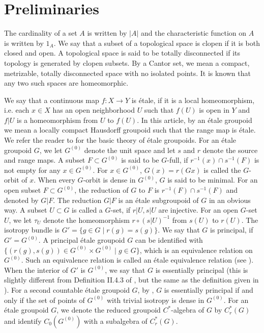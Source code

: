 \documentclass[11pt]{article}
\theoremstyle{definition}
\begin{document}
\section{Preliminaries}

The cardinality of a set $A$ is written by $\lvert A\rvert$ and 
the characteristic function on $A$ is written by $1_A$. 
We say that a subset of a topological space is clopen 
if it is both closed and open. 
A topological space is said to be totally disconnected 
if its topology is generated by clopen subsets. 
By a Cantor set, 
we mean a compact, metrizable, totally disconnected space 
with no isolated points. 
It is known that any two such spaces are homeomorphic. 

We say that a continuous map $f:X\to Y$ is \'etale, 
if it is a local homeomorphism, 
i.e. each $x\in X$ has an open neighborhood $U$ such that 
$f(U)$ is open in $Y$ and $f|U$ is a homeomorphism from $U$ to $f(U)$. 
In this article, by an \'etale groupoid 
we mean a locally compact Hausdorff groupoid 
such that the range map is \'etale. 
We refer the reader to \cite{R1,R3} 
for the basic theory of \'etale groupoids. 
For an \'etale groupoid $G$, 
we let $G^{(0)}$ denote the unit space and 
let $s$ and $r$ denote the source and range maps. 
A subset $F\subset G^{(0)}$ is said to be $G$-full, 
if $r^{-1}(x)\cap s^{-1}(F)$ is not empty for any $x\in G^{(0)}$. 
For $x\in G^{(0)}$, 
$G(x)=r(Gx)$ is called the $G$-orbit of $x$. 
When every $G$-orbit is dense in $G^{(0)}$, 
$G$ is said to be minimal. 
For an open subset $F\subset G^{(0)}$, 
the reduction of $G$ to $F$ is $r^{-1}(F)\cap s^{-1}(F)$ and 
denoted by $G|F$. 
The reduction $G|F$ is an \'etale subgroupoid of $G$ in an obvious way. 
A subset $U\subset G$ is called a $G$-set, if $r|U,s|U$ are injective. 
For an open $G$-set $U$, 
we let $\tau_U$ denote the homeomorphism $r\circ(s|U)^{-1}$ 
from $s(U)$ to $r(U)$. 
The isotropy bundle is $G'=\{g\in G\mid r(g)=s(g)\}$. 
We say that $G$ is principal, if $G'=G^{(0)}$. 
A principal \'etale groupoid $G$ can be identified with 
$\{(r(g),s(g))\in G^{(0)}\times G^{(0)}\mid g\in G\}$, 
which is an equivalence relation on $G^{(0)}$. 
Such an equivalence relation is called an \'etale equivalence relation 
(see \cite[Definition 2.1]{GPS2}). 
When the interior of $G'$ is $G^{(0)}$, 
we say that $G$ is essentially principal 
(this is slightly different from Definition II.4.3 of \cite{R1}, 
but the same as the definition given in \cite{R3}). 
For a second countable \'etale groupoid $G$, 
by \cite[Proposition 3.1]{R3}, 
$G$ is essentially principal if and only if 
the set of points of $G^{(0)}$ with trivial isotropy is dense in $G^{(0)}$. 
For an \'etale groupoid $G$, 
we denote the reduced groupoid $C^*$-algebra of $G$ by $C^*_r(G)$ and 
identify $C_0(G^{(0)})$ with a subalgebra of $C^*_r(G)$. 
\end{document}
